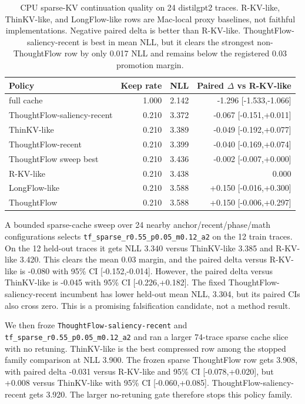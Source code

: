 \documentclass{article}
\begin{document}
\begin{table}[h]
\centering
\small
\begin{tabular}{lrrr}
\toprule
Policy & Keep rate & NLL & Paired $\Delta$ vs R-KV-like \\
\midrule
full cache & 1.000 & 2.142 & -1.296 [-1.533,-1.066] \\
ThoughtFlow-saliency-recent & 0.210 & 3.372 & -0.067 [-0.151,+0.011] \\
ThinKV-like & 0.210 & 3.389 & -0.049 [-0.192,+0.077] \\
ThoughtFlow-recent & 0.210 & 3.399 & -0.040 [-0.169,+0.074] \\
ThoughtFlow sweep best & 0.210 & 3.436 & -0.002 [-0.007,+0.000] \\
R-KV-like & 0.210 & 3.438 & 0.000 \\
LongFlow-like & 0.210 & 3.588 & +0.150 [-0.016,+0.300] \\
ThoughtFlow & 0.210 & 3.588 & +0.150 [-0.006,+0.297] \\
\bottomrule
\end{tabular}
\caption{CPU sparse-KV continuation quality on 24 distilgpt2 traces. R-KV-like, ThinKV-like, and LongFlow-like rows are Mac-local proxy baselines, not faithful implementations. Negative paired delta is better than R-KV-like. ThoughtFlow-saliency-recent is best in mean NLL, but it clears the strongest non-ThoughtFlow row by only 0.017 NLL and remains below the registered 0.03 promotion margin.}
\end{table}

A bounded sparse-cache sweep over 24 nearby anchor/recent/phase/math
configurations selects \texttt{tf\_sparse\_r0.55\_p0.05\_m0.12\_a2} on the
12 train traces. On the 12 held-out traces it gets NLL 3.340 versus ThinKV-like
3.385 and R-KV-like 3.420. This clears the mean 0.03 margin, and the paired
delta versus R-KV-like is -0.080 with 95\% CI [-0.152,-0.014]. However, the
paired delta versus ThinKV-like is -0.045 with 95\% CI [-0.226,+0.182]. The
fixed ThoughtFlow-saliency-recent incumbent has lower held-out mean NLL, 3.304,
but its paired CIs also cross zero. This is a promising falsification candidate,
not a method result.

We then froze \texttt{ThoughtFlow-saliency-recent} and
\texttt{tf\_sparse\_r0.55\_p0.05\_m0.12\_a2} and ran a larger 74-trace sparse
cache slice with no retuning. ThinKV-like is the best compressed row among the
stopped family comparison at NLL 3.900. The frozen sparse ThoughtFlow row gets
3.908, with paired delta -0.031 versus R-KV-like and 95\% CI
[-0.078,+0.020], but +0.008 versus ThinKV-like with 95\% CI
[-0.060,+0.085]. ThoughtFlow-saliency-recent gets 3.920. The larger
no-retuning gate therefore stops this policy family.
\end{document}
